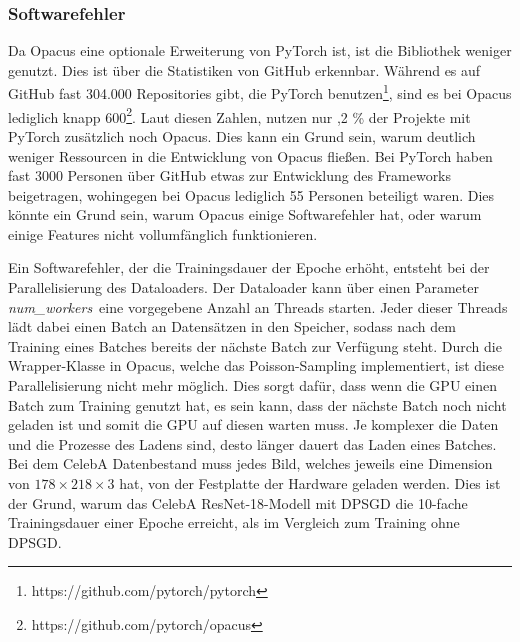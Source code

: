 \subsubsection*{Softwarefehler}

Da Opacus eine optionale Erweiterung von PyTorch ist, ist die Bibliothek weniger genutzt.
Dies ist über die Statistiken von GitHub erkennbar. 
Während es auf GitHub fast 304.000 Repositories gibt, die PyTorch benutzen\footnote{https://github.com/pytorch/pytorch}, sind es bei Opacus lediglich knapp 600\footnote{https://github.com/pytorch/opacus}.
Laut diesen Zahlen, nutzen nur ,2 \% der Projekte mit PyTorch zusätzlich noch Opacus.
Dies kann ein Grund sein, warum deutlich weniger Ressourcen in die Entwicklung von Opacus fließen.
Bei PyTorch haben fast 3000 Personen über GitHub etwas zur Entwicklung des Frameworks beigetragen, wohingegen bei Opacus lediglich 55 Personen beteiligt waren.
Dies könnte ein Grund sein, warum Opacus einige Softwarefehler hat, oder warum einige Features nicht vollumfänglich funktionieren.

Ein Softwarefehler, der die Trainingsdauer der Epoche erhöht, entsteht bei der Parallelisierung des Dataloaders.
Der Dataloader kann über einen Parameter \dq\textit{num\_workers}\dq\ eine vorgegebene Anzahl an Threads starten. 
Jeder dieser Threads lädt dabei einen Batch an Datensätzen in den Speicher, sodass nach dem Training eines Batches bereits der nächste Batch zur Verfügung steht.
Durch die Wrapper-Klasse in Opacus, welche das Poisson-Sampling implementiert, ist diese Parallelisierung nicht mehr möglich.
Dies sorgt dafür, dass wenn die GPU einen Batch zum Training genutzt hat, es sein kann, dass der nächste Batch noch nicht geladen ist und somit die GPU auf diesen warten muss.
Je komplexer die Daten und die Prozesse des Ladens sind, desto länger dauert das Laden eines Batches.
Bei dem CelebA Datenbestand muss jedes Bild, welches jeweils eine Dimension von $178\times218\times3$ hat, von der Festplatte der Hardware geladen werden.
Dies ist der Grund, warum das CelebA ResNet-18-Modell mit DPSGD die 10-fache Trainingsdauer einer Epoche erreicht, als im Vergleich zum Training ohne DPSGD.

